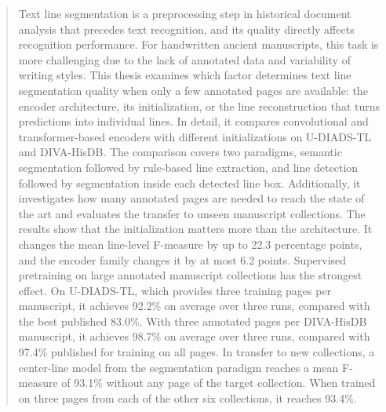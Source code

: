 \documentclass[twoside]{vutinfth}
\begin{document}
\begin{abstract}
    Text line segmentation is a preprocessing step in historical document analysis that precedes text recognition, and its quality directly affects recognition performance. For handwritten ancient manuscripts, this task is more challenging due to the lack of annotated data and variability of writing styles. This thesis examines which factor determines text line segmentation quality when only a few annotated pages are available: the encoder architecture, its initialization, or the line reconstruction that turns predictions into individual lines. In detail, it compares convolutional and transformer-based encoders with different initializations on U-DIADS-TL and DIVA-HisDB. The comparison covers two paradigms, semantic segmentation followed by rule-based line extraction, and line detection followed by segmentation inside each detected line box. Additionally, it investigates how many annotated pages are needed to reach the state of the art and evaluates the transfer to unseen manuscript collections. The results show that the initialization matters more than the architecture. It changes the mean line-level F-measure by up to 22.3 percentage points, and the encoder family changes it by at most 6.2 points. Supervised pretraining on large annotated manuscript collections has the strongest effect. On U-DIADS-TL, which provides three training pages per manuscript, it achieves 92.2\% on average over three runs, compared with the best published 83.0\%. With three annotated pages per DIVA-HisDB manuscript, it achieves 98.7\% on average over three runs, compared with 97.4\% published for training on all pages. In transfer to new collections, a center-line model from the segmentation paradigm reaches a mean F-measure of 93.1\% without any page of the target collection. When trained on three pages from each of the other six collections, it reaches 93.4\%.
\end{abstract}


\tableofcontents %

\mainmatter







\end{document}
